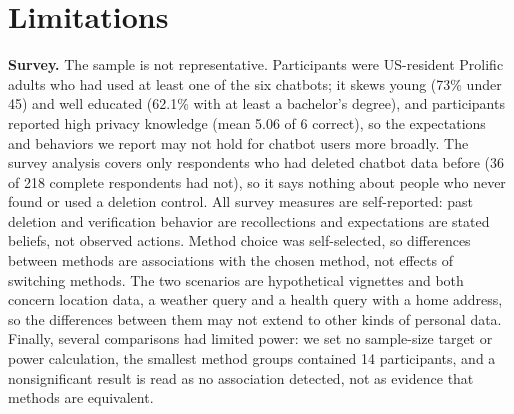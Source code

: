 \documentclass[conference,compsoc]{IEEEtran}
\begin{document}
\section{Limitations}
\label{sec:limitations}
\textbf{Survey.} The sample is not representative. Participants were
US-resident Prolific adults who had used at least one of the six chatbots; it
skews young (73\% under 45) and well educated (62.1\% with at least a bachelor's
degree), and participants reported high privacy knowledge (mean 5.06 of 6
correct), so the expectations and behaviors we report may not hold for chatbot
users more broadly. The survey analysis covers only respondents who had deleted
chatbot data before (36 of 218 complete respondents had not), so it says nothing
about people who never found or used a deletion control. All survey measures are
self-reported: past deletion and verification behavior are recollections and
expectations are stated beliefs, not observed actions. Method choice was
self-selected, so differences between methods are associations with the chosen
method, not effects of switching methods. The two scenarios are hypothetical
vignettes and both concern location data, a weather query and a health query
with a home address, so the differences between them may not extend to other
kinds of personal data. Finally, several comparisons had limited power: we set no
sample-size target or power calculation, the smallest method groups contained
14 participants, and a nonsignificant result is read as no association
detected, not as evidence that methods are equivalent.
\end{document}
